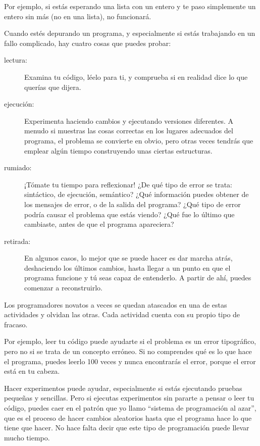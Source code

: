 Por ejemplo, si estás esperando una lista con un entero y te
paso simplemente un entero sin más (no en una lista), no funcionará.

Cuando estés depurando un programa, y especialmente si estás
trabajando en un fallo complicado, hay cuatro cosas que puedes probar:

\begin{description}

\item[lectura:] Examina tu código, léelo para ti, y comprueba
si en realidad dice lo que querías que dijera.

\item[ejecución:] Experimenta haciendo cambios y ejecutando versiones
diferentes. A menudo si muestras las cosas correctas en los lugares
adecuados del programa, el problema se convierte en obvio, pero otras veces
tendrás que emplear algún tiempo construyendo unas ciertas estructuras.

\item[rumiado:] ¡Tómate tu tiempo para reflexionar! ¿De qué tipo de error
se trata: sintáctico, de ejecución, semántico? ¿Qué información puedes obtener de
los mensajes de error, o de la salida del programa? ¿Qué tipo de
error podría causar el problema que estás viendo? ¿Qué fue lo último
que cambiaste, antes de que el programa apareciera?

\item[retirada:] En algunos casos, lo mejor que se puede hacer
es dar marcha atrás, deshaciendo los últimos cambios, hasta llegar
a un punto en que el programa funcione y tú seas capaz de entenderlo. A partir de ahí,
puedes comenzar a reconstruirlo.

\end{description}

Los programadores novatos a veces se quedan atascados en una de estas actividades
y olvidan las otras. Cada actividad cuenta con su propio tipo
de fracaso.


Por ejemplo, leer tu código puede ayudarte si el problema es un
error tipográfico, pero no si se trata de un concepto
erróneo. Si no comprendes qué es lo que hace el programa, puedes
leerlo 100 veces y nunca encontrarás el error, porque el error está en
tu cabeza.


Hacer experimentos puede ayudar, especialmente si estás ejecutando
pruebas pequeñas y sencillas. Pero si ejecutas experimentos sin pararte a pensar
o leer tu código, puedes caer en el patrón que yo llamo ``sistema de programación al azar'',
que es el proceso de hacer cambios aleatorios hasta que el programa
hace lo que tiene que hacer. No hace falta decir que este tipo de programación
puede llevar mucho tiempo.

